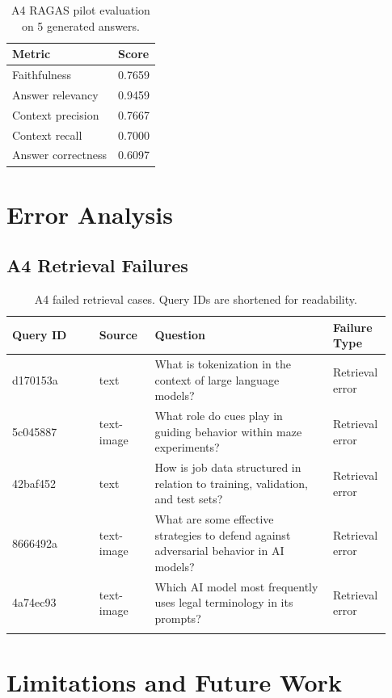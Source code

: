 \documentclass[11pt]{article}
\begin{document}
\begin{table}[H]
\centering
\small
\begin{tabular}{ll}
\toprule
Metric & Score \\
\midrule
Faithfulness & 0.7659 \\
Answer relevancy & 0.9459 \\
Context precision & 0.7667 \\
Context recall & 0.7000 \\
Answer correctness & 0.6097 \\
\bottomrule
\end{tabular}
\caption{A4 RAGAS pilot evaluation on 5 generated answers.}
\end{table}

\section{Error Analysis}

\subsection{A4 Retrieval Failures}

\begin{longtable}{p{0.22\linewidth}p{0.14\linewidth}p{0.45\linewidth}p{0.12\linewidth}}
\toprule
Query ID & Source & Question & Failure Type \\
\midrule
\endhead
d170153a & text & What is tokenization in the context of large language models? & Retrieval error \\
5c045887 & text-image & What role do cues play in guiding behavior within maze experiments? & Retrieval error \\
42baf452 & text & How is job data structured in relation to training, validation, and test sets? & Retrieval error \\
8666492a & text-image & What are some effective strategies to defend against adversarial behavior in AI models? & Retrieval error \\
4a74ec93 & text-image & Which AI model most frequently uses legal terminology in its prompts? & Retrieval error \\
\bottomrule
\caption{A4 failed retrieval cases. Query IDs are shortened for readability.}
\end{longtable}

\section{Limitations and Future Work}
\end{document}

